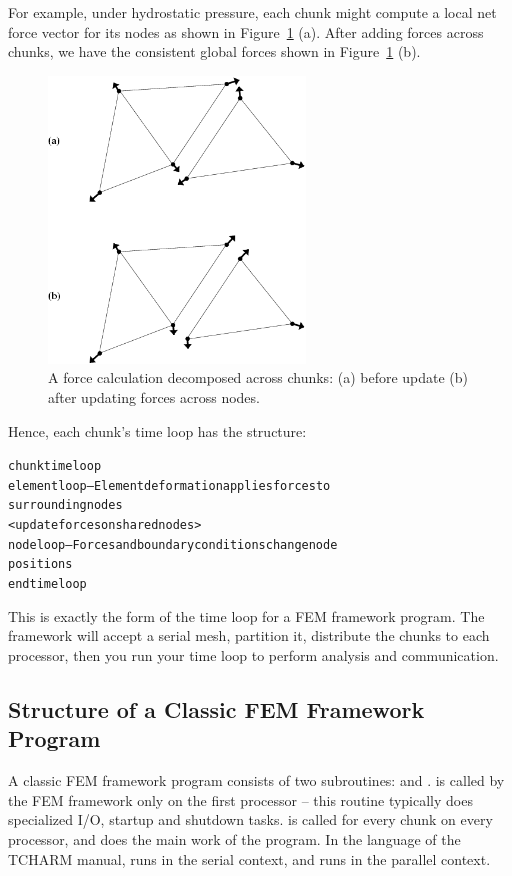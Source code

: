 \documentclass[10pt]{article}
\begin{document}
For example, under hydrostatic pressure, each chunk might compute a local
net force vector for its nodes as shown in Figure~\ref{fig:forcedecomp}
(a).  After adding forces across chunks, we have the consistent global forces
shown in Figure~\ref{fig:forcedecomp} (b).

\begin{figure}[h]
\begin{center}
\includegraphics[height=3in]{fig/forcedecomp}
\end{center}
\caption{A force calculation decomposed across chunks: (a) before update
(b) after updating forces across nodes.}
\label{fig:forcedecomp}
\end{figure}

Hence, each chunk's time loop has the structure:

\begin{alltt}
     chunk time loop
          element loop-- Element deformation applies forces to
          surrounding nodes
          <update forces on shared nodes>
          node loop-- Forces and boundary conditions change node
          positions
     end time loop
\end{alltt}

This is exactly the form of the time loop for a \charmpp{} FEM framework
program.  The framework will accept a serial mesh, partition it, distribute
the chunks to each processor, then you run your time loop to perform
analysis and communication.


\subsection{Structure of a Classic FEM Framework Program}

A classic FEM framework program consists of two subroutines: 
 and .
 is called by the FEM framework
only on the first processor -- this routine typically does specialized I/O,
startup and shutdown tasks.   is called for every chunk on every
processor, and does the main work of the program.  In the language of the
TCHARM manual,  runs in the serial context, 
and  runs in the parallel context.
\end{document}
